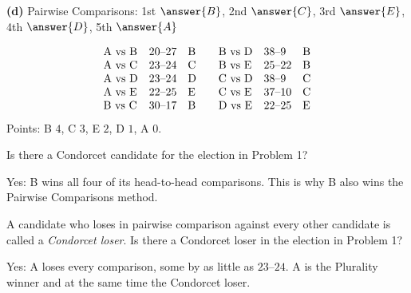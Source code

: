 \documentclass[12pt]{ximera}
\begin{document}
\begin{problem}
\begin{prompt}
\textbf{(d)} Pairwise Comparisons: 1st $\answer{B}$, 2nd $\answer{C}$, 3rd $\answer{E}$,
4th $\answer{D}$, 5th $\answer{A}$

\begin{feedback}
\[
\begin{array}{lll@{\qquad}lll}
\text{A vs B} & 20\text{--}27 & \text{B} & \text{B vs D} & 38\text{--}9 & \text{B}\\
\text{A vs C} & 23\text{--}24 & \text{C} & \text{B vs E} & 25\text{--}22 & \text{B}\\
\text{A vs D} & 23\text{--}24 & \text{D} & \text{C vs D} & 38\text{--}9 & \text{C}\\
\text{A vs E} & 22\text{--}25 & \text{E} & \text{C vs E} & 37\text{--}10 & \text{C}\\
\text{B vs C} & 30\text{--}17 & \text{B} & \text{D vs E} & 22\text{--}25 & \text{E}
\end{array}
\]
Points: B $4$, C $3$, E $2$, D $1$, A $0$.
\end{feedback}
\end{prompt}
\end{problem}

\begin{problem}
Is there a Condorcet candidate for the election in Problem 1?

\begin{multipleChoice}
\end{multipleChoice}

\begin{feedback}
Yes: B wins all four of its head-to-head comparisons. This is why B also wins the
Pairwise Comparisons method.
\end{feedback}
\end{problem}

\begin{problem}
A candidate who loses in pairwise comparison against every other candidate is called a
\emph{Condorcet loser}. Is there a Condorcet loser in the election in Problem 1?

\begin{multipleChoice}
\end{multipleChoice}

\begin{feedback}
Yes: A loses every comparison, some by as little as $23$--$24$. A is the Plurality
winner and at the same time the Condorcet loser.
\end{feedback}
\end{problem}
\end{document}
